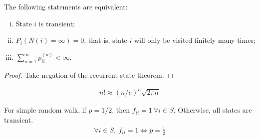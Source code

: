 \documentclass{article}
\begin{document}
	\begin{theorem}
		The following statements are equivalent:
    	\begin{enumerate}[(i)]
    		\item State $i$ is transient;
    		\item $P_i(N(i) = \infty) = 0$, that is, state $i$ will only be visited finitely many times;
    		\item $\sum_{n=1}^\infty p_{ii}^{(n)} < \infty$.
    	\end{enumerate}
	\end{theorem}
 
 	\begin{proof}
 		Take negation of the recurrent state theorem.
 	\end{proof}
 
    \begin{lemma}
    	\begin{align}
    		n! \approx (n/e)^n \sqrt{2\pi n}
    	\end{align}
    \end{lemma}

    \begin{proposition}
    	For simple random walk, if $p=1/2$, then $f_{ii} = 1\ \forall i \in S$. Otherwise, all states are transient.
    	\begin{align}
    		\forall i \in S,\ f_{ii} = 1 \iff p = \frac{1}{2}
    	\end{align}
    \end{proposition}
    
\end{document}
